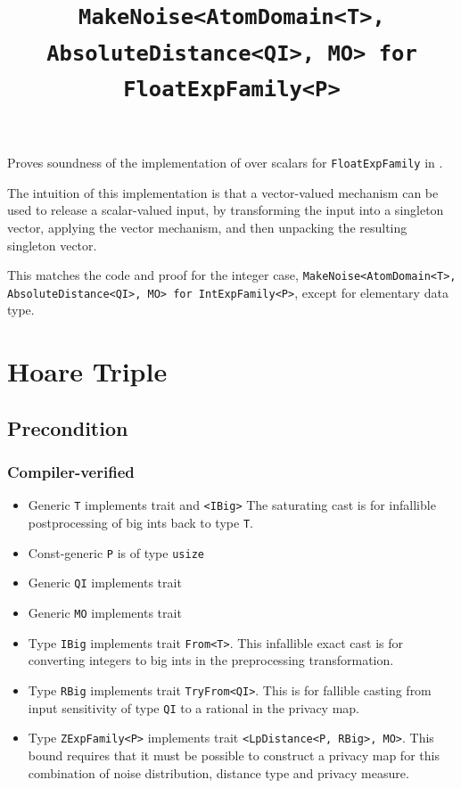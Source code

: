 \documentclass{article}
\title{\texttt{MakeNoise<AtomDomain<T>, AbsoluteDistance<QI>, MO> for FloatExpFamily<P>}}
\author{\MichaelShoemateAuthor}
\date{}
\begin{document}
\maketitle

\contrib
Proves soundness of the implementation of  over scalars
for \texttt{FloatExpFamily} in .

The intuition of this implementation is that a vector-valued mechanism can be used to release a scalar-valued input,
by transforming the input into a singleton vector,
applying the vector mechanism, and then unpacking the resulting singleton vector.

This matches the code and proof for the integer case, \texttt{MakeNoise<AtomDomain<T>, AbsoluteDistance<QI>, MO> for IntExpFamily<P>},
except for elementary data type.

\section{Hoare Triple}
\subsection*{Precondition}
\subsubsection*{Compiler-verified}

\begin{itemize}
    \item Generic \texttt{T} implements trait  and \texttt{<IBig>}
        The saturating cast is for infallible postprocessing of big ints back to type \texttt{T}.
    \item Const-generic \texttt{P} is of type \texttt{usize}
    \item Generic \texttt{QI} implements trait 
    \item Generic \texttt{MO} implements trait 
    \item Type \texttt{IBig} implements trait \texttt{From<T>}.
        This infallible exact cast is for converting integers to big ints in the preprocessing transformation.
    \item Type \texttt{RBig} implements trait \texttt{TryFrom<QI>}.
        This is for fallible casting from input sensitivity of type \texttt{QI} to a rational in the privacy map.
    \item Type \texttt{ZExpFamily<P>} implements trait \texttt{<LpDistance<P, RBig>, MO>}.
        This bound requires that it must be possible to construct a privacy map for this combination of noise distribution, distance type and privacy measure.
\end{itemize}
\end{document}
